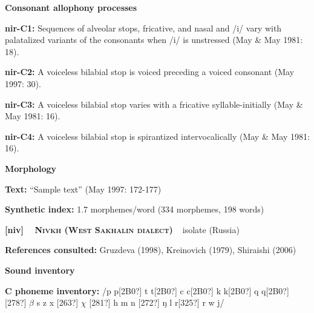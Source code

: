 \begin{styleBody}
\textbf{Consonant allophony processes}
\end{styleBody}

\begin{styleBody}
\textbf{nir-C1: }Sequences of alveolar stops, fricative, and nasal and /i/ vary with palatalized variants of the consonants when /i/ is unstressed (May \& May 1981: 18).
\end{styleBody}

\begin{styleBody}
\textbf{nir-C2: }A voiceless bilabial stop is voiced preceding a voiced consonant (May 1997: 30).
\end{styleBody}

\begin{styleBody}
\textbf{nir-C3: }A voiceless bilabial stop varies with a fricative syllable-initially (May \& May 1981: 16).
\end{styleBody}

\begin{styleBody}
\textbf{nir-C4: }A voiceless bilabial stop is spirantized intervocalically (May \& May 1981: 16).
\end{styleBody}

\begin{styleBody}
\textbf{Morphology}
\end{styleBody}

\begin{styleBody}
\textbf{Text:} “Sample text” (May 1997: 172-177)
\end{styleBody}

\begin{styleBody}
\textbf{Synthetic index: }1.7 morphemes/word (334 morphemes, 198 words)
\end{styleBody}

\clearpage\begin{styleBody}
\textbf{[niv] }\ \ \textbf{\textsc{Nivkh (West Sakhalin dialect)}}\textbf{\ \ }isolate (Russia)
\end{styleBody}

\begin{styleBody}
\textbf{References consulted: }Gruzdeva (1998), Kreinovich (1979), Shiraishi (2006)
\end{styleBody}

\begin{styleBody}
\textbf{Sound inventory}
\end{styleBody}

\begin{styleBody}
\textbf{C phoneme inventory:} /p p[2B0?] t t[2B0?] c c[2B0?] k k[2B0?] q q[2B0?] [278?] $\beta $ s z x [263?] $\chi $ [281?] h m n [272?] ŋ l r[325?] r w j/
\end{styleBody}

